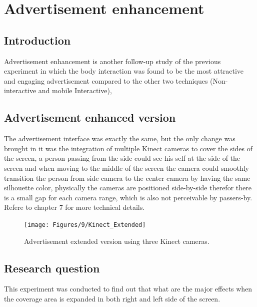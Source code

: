 \chapter{Advertisement enhancement} %

\label{Chapter9} %
\newpage






\section{Introduction}




Advertisement enhancement is another follow-up study of the previous experiment in which the body interaction was found to be the most attractive and engaging advertisement compared to the other two techniques (Non-interactive and mobile Interactive), 






\section{Advertisement enhanced version}

The advertisement interface was exactly the same, but the only change was brought in it was the integration of multiple Kinect cameras to cover the sides of the screen, a person passing from the side could see his self at the side of the screen and when moving to the middle of the screen the camera could smoothly transition the person from side camera to the center camera by having the same silhouette color, physically the cameras are positioned side-by-side therefor there is a small gap for each camera range, which is also not perceivable by passers-by. Refere to chapter 7 for more technical details.


\begin{figure}[H]
    \centering
    \texttt{[image: Figures/9/Kinect\_Extended]}
    \caption{Advertisement extended version using three Kinect cameras.}%
    \label{fig:KinectExtended}%
\end{figure}




\section{Research question}
This experiment was conducted to find out that what are the major effects when the coverage area is expanded in both right and left side of the screen.


